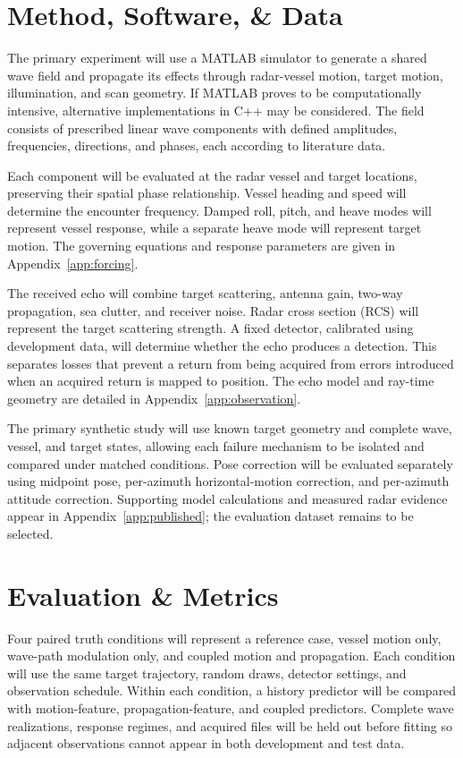 \documentclass[10pt,letterpaper]{article}
\begin{document}
\section{Method, Software, \& Data}


The primary experiment will use a MATLAB simulator to generate a shared wave field and propagate its effects through radar-vessel motion, target motion, illumination, and scan geometry. If MATLAB proves to be computationally intensive, alternative implementations in C++ may be considered. The field consists of prescribed linear wave components with defined amplitudes, frequencies, directions, and phases, each according to literature data.

Each component will be evaluated at the radar vessel and target locations, preserving their spatial phase relationship. Vessel heading and speed will determine the encounter frequency. Damped roll, pitch, and heave modes will represent vessel response, while a separate heave mode will represent target motion. The governing equations and response parameters are given in Appendix~\ref{app:forcing}.

The received echo will combine target scattering, antenna gain, two-way propagation, sea clutter, and receiver noise. Radar cross section (RCS) will represent the target scattering strength. A fixed detector, calibrated using development data, will determine whether the echo produces a detection. This separates losses that prevent a return from being acquired from errors introduced when an acquired return is mapped to position. The echo model and ray-time geometry are detailed in Appendix~\ref{app:observation}.

The primary synthetic study will use known target geometry and complete wave, vessel, and target states, allowing each failure mechanism to be isolated and compared under matched conditions. Pose correction will be evaluated separately using midpoint pose, per-azimuth horizontal-motion correction, and per-azimuth attitude correction. Supporting model calculations and measured radar evidence appear in Appendix~\ref{app:published}; the evaluation dataset remains to be selected.



\section{Evaluation \& Metrics}

Four paired truth conditions will represent a reference case, vessel motion only, wave-path modulation only, and coupled motion and propagation. Each condition will use the same target trajectory, random draws, detector settings, and observation schedule. Within each condition, a history predictor will be compared with motion-feature, propagation-feature, and coupled predictors. Complete wave realizations, response regimes, and acquired files will be held out before fitting so adjacent observations cannot appear in both development and test data.
\end{document}
